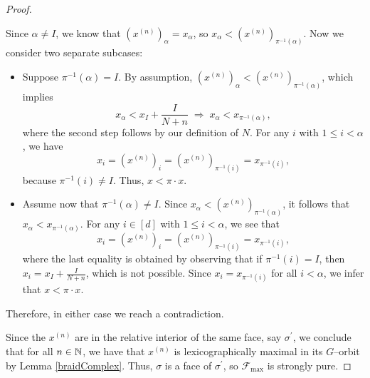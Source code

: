 \begin{proof}
\begin{enumerate}
    Since $\alpha \neq I$, we know that $(x^{(n)})_\alpha = x_\alpha$, so $x_\alpha < (x^{(n)})_{\pi^{-1}(\alpha)}$. Now we consider two separate subcases:
    \begin{itemize}
    \item Suppose $\pi^{-1}(\alpha) = I$. By assumption, $(x^{(n)})_\alpha  <  (x^{(n)})_{\pi^{-1}(\alpha)}$, which implies \[x_\alpha < x_I + \frac{I}{N + n} \; \Longrightarrow \; x_\alpha < x_{\pi^{-1}(\alpha)},\] where the second step follows by our definition of $N$. For any $i$ with $1 \le i < \alpha$, we have \[x_i = (x^{(n)})_i = (x^{(n)})_{\pi^{-1}(i)} = x_{\pi^{-1}(i)},\] because $\pi^{-1}(i) \neq I$. Thus, $x < \pi \cdot x$.
    \item Assume now that $\pi^{-1}(\alpha) \neq I$. Since $x_\alpha < (x^{(n)})_{\pi^{-1}(\alpha)}$, it follows that $x_\alpha < x_{\pi^{-1}(\alpha)}$. For any $i\in[d]$ with $1 \le i < \alpha$, we see that \[x_i = (x^{(n)})_i = (x^{(n)})_{\pi^{-1}(i)} = x_{\pi^{-1}(i)},\] where the last equality is obtained by observing that if $\pi^{-1}(i) = I$, then $x_i = x_I + \frac{I}{N + n}$, which is not possible. Since $x_i = x_{\pi^{-1}(i)}$ for all $i < \alpha$, we infer that $x < \pi\cdot x$.
    \end{itemize}
    Therefore, in either case we reach a contradiction.
\end{enumerate}

Since the $x^{(n)}$ are in the relative interior of the same face, say $\sigma^\prime$, we conclude that for all $n\in\mathbb{N}$, we have that $x^{(n)}$ is lexicographically maximal in its $G$--orbit by Lemma \ref{braidComplex}. Thus, $\sigma$ is a face of $\sigma^\prime$, so $\mathcal{F}_{\max}$ is strongly pure.
\end{proof}